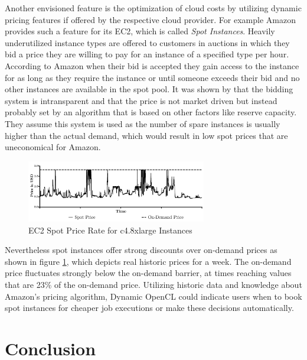 Another envisioned feature is the optimization of cloud costs by utilizing dynamic pricing features if offered by the respective cloud provider. For example Amazon provides such a feature for its EC2, which is called \textit{Spot Instances}. Heavily underutilized instance types are offered to customers in auctions in which they bid a price they are willing to pay for an instance of a specified type per hour. According to Amazon when their bid is accepted they gain access to the instance for as long as they require the instance or until someone exceeds their bid and no other instances are available in the spot pool\cite{spot_instances}. It was shown by \citeauthor{spot_instance_pricing} that the bidding system is intransparent and that the price is not market driven but instead probably set by an algorithm that is based on other factors like reserve capacity\cite{spot_instance_pricing}. They assume this system is used as the number of spare instances is usually higher than the actual demand, which would result in low spot prices that are uneconomical for Amazon. 
\begin{figure}[!htb]	
	\includegraphics[width=0.7\textwidth]{images/ec2_spot_prices.pdf}
	\centering
	\caption{EC2 Spot Price Rate for c4.8xlarge Instances}
	\label{img:spot_pricing}
\end{figure}
Nevertheless spot instances offer strong discounts over on-demand prices as shown in figure \ref{img:spot_pricing}, which depicts real historic prices for a week. The on-demand price fluctuates strongly below the on-demand barrier, at times reaching values that are 23\% of the on-demand price. Utilizing historic data and knowledge about Amazon's pricing algorithm, Dynamic OpenCL could indicate users when to book spot instances for cheaper job executions or make these decisions automatically.

\chapter{Conclusion}

